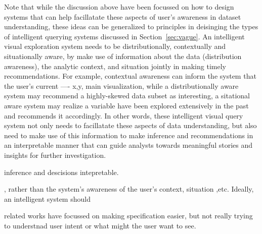 \par Note that while the discussion above have been focussed on how to design systems that can help facillatate these aspects of user's awareness in dataset understanding, these ideas can be generalized to principles in deisinging the types of intelligent querying systems discussed in Section~\ref{sec:vague}. An intelligent visual exploration system needs to be distributionally, contextually and situationally aware, by make use of information about the data (distribution awareness), the analytic context, and situation jointly in making timely recommendations. For example, contextual awareness can inform the system that the user's current ---- x,y, main visualization, while a distributionally aware system may recommend a highly-skewed data subset as interesting, a sitational aware system may realize a variable have been explored extensively in the past and recommends it accordingly. In other words, these intelligent visual query system not only needs to facillatate these aspects of data understanding, but also need to make use of this information to make inference and recommendations in an interpretable manner that can guide analysts towards meaningful stories and insights for further investigation.

inference and descisions intepretable.

, rather than the system's awareness of the user's context, situation ,etc. Ideally, an intelligent system  should 


related works have focussed on making specification easier, but not really trying to understnad user intent or what might the user want to see.
